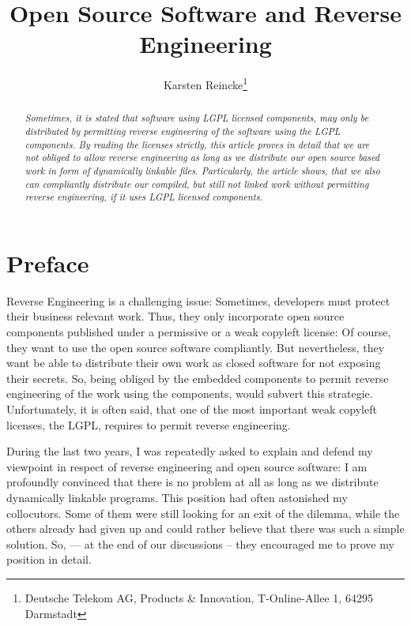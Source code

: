 \documentclass[DIV=calc,BCOR=5mm,12pt,headings=small,oneside,toc=bib]{scrartcl}
\begin{document}

\titlehead{Version 1.0}

\subject{\small \itshape How to Achieve Open Source License Compliance} 

\title{Open Source Software and Reverse Engineering}

\author{
Karsten Reincke\thanks{Deutsche Telekom AG, Products \& Innovation, 
T-Online-Allee 1, 64295 Darmstadt}
}

\maketitle

\normalsize

\begin{abstract}\noindent\emph{Sometimes, it is stated that software using LGPL
licensed components, may only be distributed by permitting reverse engineering
of the software using the LGPL components. By reading the licenses strictly,
this article proves in detail that we are not obliged to allow reverse
engineering as long as we distribute our open source based work in form of
dynamically linkable files. Particularly, the article shows, that we also can
compliantly distribute our compiled, but still not linked work without
permitting reverse engineering, if it uses LGPL licensed components.}
\end{abstract}

\section{Preface}

Reverse Engineering is a challenging issue: Sometimes, developers must protect
their business relevant work. Thus, they only incorporate open source components
published under a permissive or a weak copyleft license: Of course, they want to
use the open source software compliantly. But nevertheless, they want be able to
distribute their own work as closed software for not exposing their secrets. So,
being obliged by the embedded components to permit reverse engineering of the
work using the components, would subvert this strategie. Unfortunately, it is
often said, that one of the most important weak copyleft licenses, the LGPL,
requires to permit reverse engineering.

During the last two years, I was repeatedly asked to explain and defend my
viewpoint in respect of reverse engineering and open source software: I am
profoundly convinced that there is no problem at all as long as we distribute
dynamically linkable programs. This position had often astonished my
collocutors. Some of them were still looking for an exit of the dilemma, while
the others already had given up and could rather believe that there was such a
simple solution. So, --- at the end of our discussions -- they encouraged me to
prove my position in detail.
\end{document}
